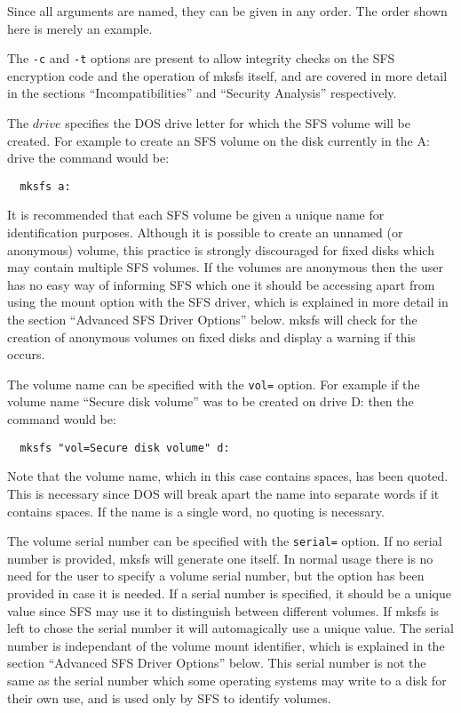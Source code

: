 Since all arguments are named, they can be given in any order.  The order shown
here is merely an example.

The {\tt -c} and {\tt -t} options are present to allow integrity checks on the SFS
encryption code and the operation of mksfs itself, and are covered in more
detail in the sections ``Incompatibilities'' and ``Security Analysis''
respectively.

The $drive$ specifies the DOS drive letter for which the SFS volume will be
created.  For example to create an SFS volume on the disk currently in the A:
drive the command would be:

{\tt \verb|  |mksfs a:}

It is recommended that each SFS volume be given a unique name for
identification purposes.  Although it is possible to create an unnamed (or
anonymous) volume, this practice is strongly discouraged for fixed disks which
may contain multiple SFS volumes.  If the volumes are anonymous then the user
has no easy way of informing SFS which one it should be accessing apart from
using the mount option with the SFS driver, which is explained in more detail 
in the section ``Advanced SFS Driver Options'' below.  mksfs will check for the 
creation of anonymous volumes on fixed disks and display a warning if this 
occurs.

The volume name can be specified with the {\tt vol=} option.  For example if the
volume name ``Secure disk volume'' was to be created on drive D: then the 
command would be:

{\tt \verb|  |mksfs "vol=Secure disk volume" d:}

Note that the volume name, which in this case contains spaces, has been quoted.
This is necessary since DOS will break apart the name into separate words if it
contains spaces.  If the name is a single word, no quoting is necessary.

The volume serial number can be specified with the {\tt serial=} option.  If no
serial number is provided, mksfs will generate one itself.  In normal usage
there is no need for the user to specify a volume serial number, but the option
has been provided in case it is needed.  If a serial number is specified, it 
should be a unique value since SFS may use it to distinguish between different 
volumes. If mksfs is left to chose the serial number it will automagically use 
a unique value.  The serial number is independant of the volume mount 
identifier, which is explained in the section ``Advanced SFS Driver Options'' 
below.  This serial number is not the same as the serial number which some
operating systems may write to a disk for their own use, and is used only by
SFS to identify volumes.

